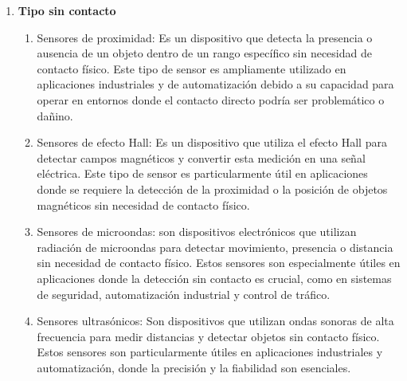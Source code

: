 \begin{enumerate}
\begin{enumerate}
		\end{enumerate}
		\item \textbf{Tipo sin contacto}
		\begin{enumerate}
			\item Sensores de proximidad:  Es un dispositivo que detecta la presencia o ausencia de un objeto dentro de un rango específico sin necesidad de contacto físico. Este tipo de sensor es ampliamente utilizado en aplicaciones industriales y de automatización debido a su capacidad para operar en entornos donde el contacto directo podría ser problemático o dañino.\cite{Prox}\\ 
			\begin{figure}[h]
				\centering
				\hfill
			\end{figure}
			\item Sensores de efecto Hall: Es un dispositivo que utiliza el efecto Hall para detectar campos magnéticos y convertir esta medición en una señal eléctrica. Este tipo de sensor es particularmente útil en aplicaciones donde se requiere la detección de la proximidad o la posición de objetos magnéticos sin necesidad de contacto físico.\cite{EHall}\\ 
			\begin{figure}[h]
				\centering
				\hfill
			\end{figure}
			\item Sensores de microondas: son dispositivos electrónicos que utilizan radiación de microondas para detectar movimiento, presencia o distancia sin necesidad de contacto físico. Estos sensores son especialmente útiles en aplicaciones donde la detección sin contacto es crucial, como en sistemas de seguridad, automatización industrial y control de tráfico.\cite{microo}\\ 
			\begin{figure}[h]
				\centering
				\hfill
			\end{figure}
			\item Sensores ultrasónicos: Son dispositivos que utilizan ondas sonoras de alta frecuencia para medir distancias y detectar objetos sin contacto físico. Estos sensores son particularmente útiles en aplicaciones industriales y automatización, donde la precisión y la fiabilidad son esenciales.\cite{ultrason}\\ 

\end{enumerate}
\end{enumerate}
